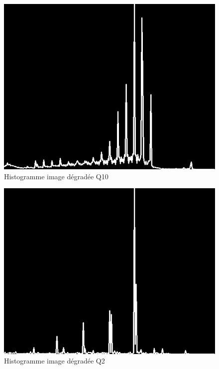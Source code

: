 \documentclass[12pt]{report}
\begin{document}
\begin{figure}[H]
\begin{center}
\includegraphics[scale=0.5]{../ImageRes/hist_2.jpg} 
\caption{Histogramme image dégradée Q10 }
\end{center}
\end{figure}

\begin{figure}[H]
\begin{center}
\includegraphics[scale=0.5]{../ImageRes/hist_3.jpg} 
\caption{Histogramme image dégradée Q2 }
\end{center}
\end{figure}
\end{document}

